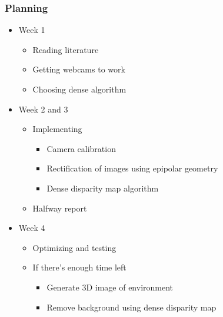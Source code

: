 \documentclass{beamer}
\begin{document}
\frame
{
  \frametitle{Planning}
  \begin{itemize}
    \item Week 1
      \begin{itemize}
        \item Reading literature
        \item Getting webcams to work
        \item Choosing dense algorithm
      \end{itemize}
    \item Week 2 and 3
      \begin{itemize}
        \item Implementing
          \begin{itemize}
            \item Camera calibration
            \item Rectification of images using epipolar geometry
            \item Dense disparity map algorithm
          \end{itemize}
        \item Halfway report
      \end{itemize}
    \item Week 4
      \begin{itemize}
        \item Optimizing and testing
        \item If there's enough time left
          \begin{itemize}
            \item Generate 3D image of environment
            \item Remove background using dense disparity map
          \end{itemize}
      \end{itemize}
  \end{itemize}
}
\end{document}
